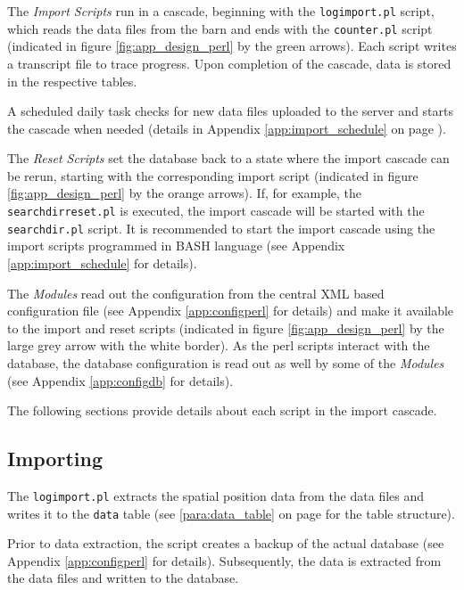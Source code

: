 The \textit{Import Scripts} run in a cascade, beginning with the \lstinline|logimport.pl| script, which reads the data files from the barn and ends with the \lstinline|counter.pl| script (indicated in figure \ref{fig:app_design_perl} by the green arrows). Each script writes a transcript file to trace progress. Upon completion of the cascade, data is stored in the respective tables.

A scheduled daily task checks for new data files uploaded to the server and starts the cascade when needed (details in Appendix \ref{app:import_schedule} on page \pageref{app:import_schedule}). 

The \textit{Reset Scripts} set the database back to a state where the import cascade can be rerun, starting with the corresponding import script (indicated in figure \ref{fig:app_design_perl} by the orange arrows). If, for example, the \lstinline|searchdirreset.pl| is executed, the import cascade will be started with the \lstinline|searchdir.pl| script. It is recommended to start the import cascade using the import scripts programmed in BASH language (see Appendix \ref{app:import_schedule} for details).

The \textit{Modules} read out the configuration from the central \ac{XML} based configuration file (see Appendix \ref{app:configperl} for details) and make it available to the import and reset scripts (indicated in figure \ref{fig:app_design_perl} by the large grey arrow with the white border). As the perl scripts interact with the database, the database configuration is read out as well by some of the \textit{Modules} (see Appendix \ref{app:configdb} for details). 

The following sections provide details about each script in the import cascade.

\subsection{Importing}
\label{subsec:importing}

The \lstinline|logimport.pl| extracts the spatial position data from the data files and writes it to the \lstinline|data| table (see \ref{para:data_table} on page \pageref{para:data_table} for the table structure).

Prior to data extraction, the  script creates a backup of the actual database (see Appendix \ref{app:configperl} for details). Subsequently, the data is extracted from the data files and written to the database. 

